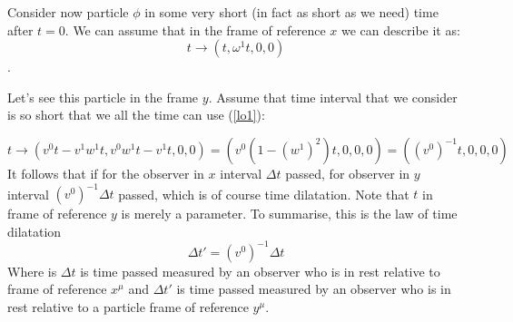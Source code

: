 \documentclass[main.tex]{subfiles}
\begin{document}
Consider now particle $\phi$ in some very short (in fact as short as we need) time after $t=0$. We can assume that in the frame of reference $x$ we can describe it as:
$$t \to (t, \omega^1t, 0, 0)$$.

Let's see this particle in the frame $y$. Assume that time interval that we consider is so short that we all the time can use (\ref{lo1}):

$$
t \to (v^0t - v^1w^1t, v^0w^1t - v^1t, 0, 0) = (v^0(1-(w^1)^2)t, 0, 0, 0) =
((v^0)^{-1}t, 0, 0, 0)
$$
It follows that if for the observer in $x$ interval $\Delta t$ passed, for observer in $y$ interval $(v^0)^{-1}\Delta t$ passed, which is of course time dilatation.  
Note that $t$ in frame of reference $y$ is merely a parameter.
To summarise, this is the law of time dilatation
\begin{equation}
\boxed{\Delta t' = (v^0)^{-1}\Delta t}
\end{equation}
Where is $\Delta t$ is time passed measured by an observer who is in rest relative to frame of reference $x^\mu$ and $\Delta t'$ is time passed measured by an observer who is in rest relative to a particle frame of reference $y^\mu$. 
\end{document}
